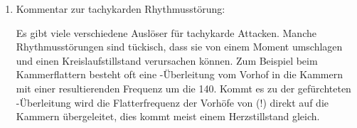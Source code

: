 \documentclass[
ngerman,
paper=a4,
asymmetric,
fontsize=10pt,
headings=small,
draft=false,
numbers=noenddot,
bibtotocnumbered,
footnotes=multiple,
toc=flat,
]{scrreprt}
\newcommand{\Neu}{\fontfamily{lmtt}\fontseries{lc}\selectfont\color{DarkGreen}}
\begin{document}
\begin{enumerate}
    {\Neu Thrombenbildung: Dies stellt wiederum ein Risko dar für:
    Daher Vorbeugung mit 
    (\enquote*{blutverdünnenden}) Medikamenten (Marcoumar
    ${\rightarrow}$ Patient ist blutungsgefährdet)
    }
    \item Kommentar zur tachykarden Rhythmusstörung:
    
    {\Neu Es gibt viele verschiedene Auslöser für tachykarde
    Attacken. Manche Rhythmusstörungen sind tückisch, dass sie
    von einem Moment umschlagen und einen Kreislaufstillstand
    verursachen können. Zum Beispiel beim Kammerflattern besteht
    oft eine -Überleitung vom Vorhof in die Kammern
    mit einer resultierenden Frequenz um die 140\PerMin*. Kommt es
    zu der gefürchteten -Überleitung wird die
    Flatterfrequenz der Vorhöfe von \PerMin* (!) direkt auf die
    Kammern übergeleitet, dies kommt meist einem Herzstillstand
    gleich. \cite{BLIM4}
    }
  \end{enumerate}
\end{document}
